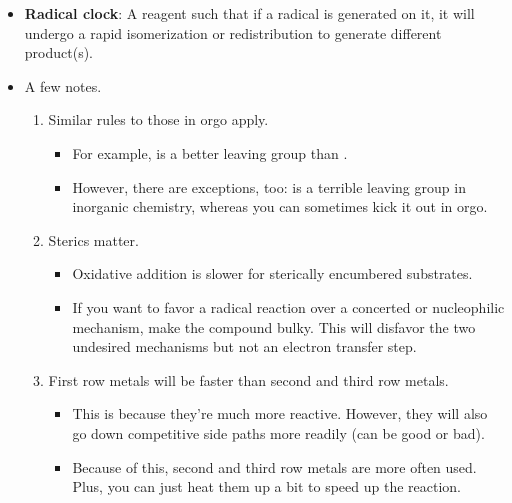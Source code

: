 \documentclass[../notes.tex]{subfiles}
\begin{document}
\begin{itemize}
\begin{itemize}
    \end{itemize}
    \item \textbf{Radical clock}: A reagent such that if a radical is generated on it, it will undergo a rapid isomerization or redistribution to generate different product(s).
    \item A few notes.
    \begin{enumerate}
        \item Similar rules to those in orgo apply.
        \begin{itemize}
            \item For example,  is a better leaving group than .
            \item However, there are exceptions, too:  is a terrible leaving group in inorganic chemistry, whereas you can sometimes kick it out in orgo.
        \end{itemize}
        \item Sterics matter.
        \begin{itemize}
            \item Oxidative addition is slower for sterically encumbered substrates.
            \item If you want to favor a radical reaction over a concerted or nucleophilic mechanism, make the compound bulky. This will disfavor the two undesired mechanisms but not an electron transfer step.
        \end{itemize}
        \item First row metals will be faster than second and third row metals.
        \begin{itemize}
            \item This is because they're much more reactive. However, they will also go down competitive side paths more readily (can be good or bad).
            \item Because of this, second and third row metals are more often used. Plus, you can just heat them up a bit to speed up the reaction.
        \end{itemize}
    \end{enumerate}
\end{itemize}
\end{document}
